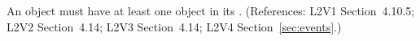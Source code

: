An \Event object must have at least one \EventAssignment object in its
.  (References: L2V1 Section~4.10.5; L2V2
Section~4.14; L2V3 Section~4.14; L2V4 Section~\ref{sec:events}.)
